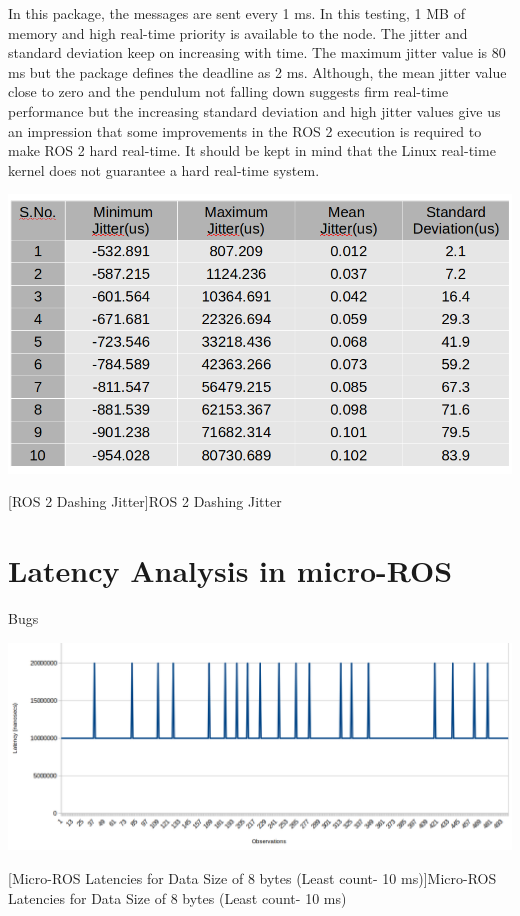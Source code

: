 \documentclass[%
xelatex,
	oneside,		%
	12pt,			%
	parskip=half,	%
	abstracton,
	chapterprefix=true%
    appendixprefix=true]
{scrbook}
\begin{document}
In this package, the messages are sent every 1 ms. In this testing, 1 MB of memory and high real-time priority is available to the node. The jitter and standard deviation keep on increasing with time. The maximum jitter value is 80 ms but the package defines the deadline as 2 ms. Although, the mean jitter value close to zero and the pendulum not falling down suggests firm real-time performance but the increasing standard deviation and high jitter values give us an impression that some improvements in the ROS 2 execution is required to make ROS 2 hard real-time. It should be kept in mind that the Linux real-time kernel does not guarantee a hard real-time system.
\begin{center}
\includegraphics[scale=0.4]{fig/ros2dashjitter.png}

[ROS 2 Dashing Jitter]{ROS 2 Dashing Jitter}
\label{tab:ros2dashjit}
\end{center}
		\section{Latency Analysis in micro-ROS}
		\vspace*{0.5cm}
		
		Bugs
\begin{center}
\includegraphics[scale=0.3]{fig/uros8byteles.png}

[Micro-ROS Latencies for Data Size of 8 bytes (Least count- 10 ms)]{Micro-ROS Latencies for Data Size of 8 bytes (Least count- 10 ms)}
\label{fig:uros8byteles}
\end{center}
\end{document}
